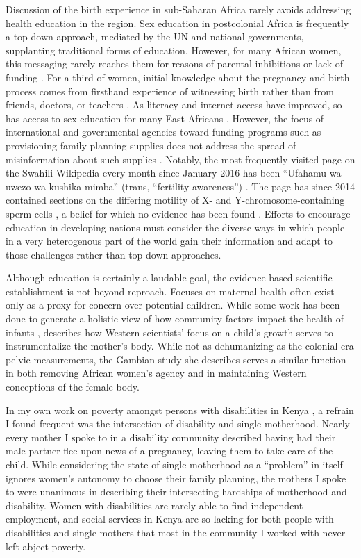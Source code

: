 \documentclass{../../../coursework}
\begin{document}
Discussion of the birth experience in sub-Saharan Africa rarely avoids
addressing health education in the region. Sex education in postcolonial 
Africa is frequently a top-down approach, mediated by the UN and national
governments, supplanting traditional forms of education. However, for many
African women, this messaging rarely reaches them for reasons of parental
inhibitions \parencite{Mbu07} or lack of funding \parencite{Agb11}. For a
third of women, initial knowledge about the pregnancy and birth process comes
from firsthand experience of witnessing birth rather than from friends,
doctors, or teachers \parencite{Cha90}. As literacy and internet access have
improved, so has access to sex education for many East Africans
\parencite{Mee95}. However, the focus of international and governmental
agencies toward funding programs such as provisioning family planning supplies
does not address the spread of misinformation about such supplies
\parencite{Chi10}. Notably, the most frequently-visited page on the Swahili
Wikipedia every month since January 2016 has been ``Ufahamu wa uwezo wa
kushika mimba'' (trans, ``fertility awareness'') \parencite{Wik}. The page has
since 2014 contained sections on the differing motility of X- and
Y-chromosome-containing sperm cells \parencite{Ufa141}, a belief for which no
evidence has been found \parencite{Hos01}. Efforts to encourage education in
developing nations must consider the diverse ways in which people in a very
heterogenous part of the world gain their information and adapt to those
challenges rather than top-down approaches.

Although education is certainly a laudable goal, the evidence-based scientific
establishment is not beyond reproach. Focuses on maternal health often exist
only as a proxy for concern over potential children. While some work has been
done to generate a holistic view of how community factors impact the health of
infants \parencite{Mag00}, \textcite{Rei19} describes how Western scientists'
focus on a child's growth serves to instrumentalize the mother's body. While
not as dehumanizing as the colonial-era pelvic measurements, the Gambian study
she describes serves a similar function in both removing African women's
agency and in maintaining Western conceptions of the female body.

In my own work on poverty amongst persons with disabilities in Kenya
\parencite{Leo19}, a refrain I found frequent was the intersection of
disability and single-motherhood. Nearly every mother I spoke to in a
disability community described having had their male partner flee upon news of
a pregnancy, leaving them to take care of the child. While considering the
state of single-motherhood as a ``problem'' in itself
\parencite[for an example, see][]{Oma95} ignores women's autonomy to choose
their family planning, the mothers I spoke to were unanimous in describing
their intersecting hardships of motherhood and disability. Women with
disabilities are rarely able to find independent employment, and social
services in Kenya are so lacking for both people with disabilities and single
mothers that most in the community I worked with never left abject poverty.
\end{document}
